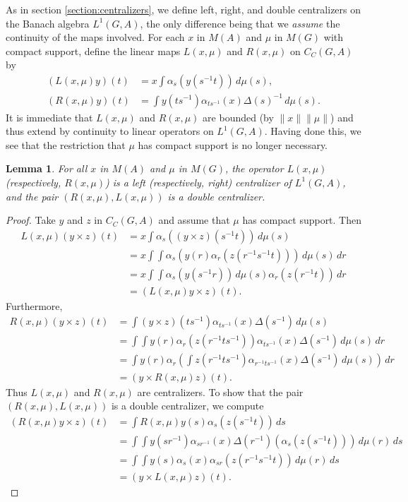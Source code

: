 \documentclass{book}
\newtheorem{lemma}[definition]{Lemma}
\begin{document}
As in section \ref{section:centralizers}, we define left, right, and double centralizers on the Banach algebra
\(L^1(G,A)\), the only difference being that we \textit{assume} the continuity of the maps
involved. For each \(x\) in \(M(A)\) and \(\mu\) in \(M(G)\) with compact support, define the linear maps \(L(x,\mu)\)
and \(R(x,\mu)\) on \(C_C(G,A)\) by
\begin{align}\label{Petersen:762}
  (L(x,\mu)y)(t)&=x\int\alpha_s(y(s^{-1}t))\,d\mu(s),\\
  (R(x,\mu)y)(t)&=\int y(t s^{-1})\alpha_{t s^{-1}}(x){\Delta(s)}^{-1}\,d\mu(s).
\end{align}
It is immediate that \(L(x,\mu)\) and \(R(x,\mu)\) are bounded (by \(\|x\|\|\mu\|\)) and thus extend by continuity to linear operators on \(L^1(G,A)\).
Having done this, we see that the restriction that \(\mu\) has compact support is no longer necessary.
\begin{lemma}\label{Petersen:763}
  For all \(x\) in \(M(A)\) and \(\mu\) in \(M(G)\), the operator \(L(x,\mu)\) (respectively, \(R(x,\mu)\)) is a left 
  (respectively, right) centralizer of \(L^1(G,A)\), and the pair \((R(x,\mu),L(x,\mu))\) is a double centralizer.
\end{lemma}
\begin{proof}
  Take \(y\) and \(z\) in \(C_C(G,A)\) and assume that \(\mu\) has compact support. Then
  \begin{align*}
    L(x,\mu)(y\times z)(t)&=x\int\alpha_s((y\times z)(s^{-1}t))\,d\mu(s)\\
    &=x\int\int\alpha_s(y(r)\alpha_r(z(r^{-1}s^{-1}t)))\,d\mu(s)\,dr\\
    &=x\int\int\alpha_s(y(s^{-1}r))\,d\mu(s)\alpha_r(z(r^{-1}t))\,dr\\
    &=(L(x,\mu)y\times z)(t).
  \end{align*}
  Furthermore,
  \begin{align*}
    R(x,\mu)(y\times z)(t)&=\int(y\times z)(t s^{-1})\alpha_{t s^{-1}}(x){\Delta(s^{-1})}\,d\mu(s)\\
    &=\int\int y(r)\alpha_r(z(r^{-1}t s^{-1}))\alpha_{t s^{-1}}(x)\Delta(s^{-1})\,d\mu(s)\,dr\\
    &=\int y(r)\alpha_r(\int z(r^{-1}t s^{-1})\alpha_{r^{-1}t s^{-1}}(x)\Delta(s^{-1})\,d\mu(s))\,dr\\
    &=(y\times R(x,\mu)z)(t).
  \end{align*}
  Thus \(L(x,\mu)\) and \(R(x,\mu)\) are centralizers. To show that the pair \((R(x,\mu),L(x,\mu))\) is a double centralizer, we compute
  \begin{align*}
    (R(x,\mu)y\times z)(t)&=\int R(x,\mu)y(s)\alpha_s(z(s^{-1}t))\,ds\\
    &=\int\int y(s r^{-1})\alpha_{s r^{-1}}(x)\Delta(r^{-1})(\alpha_s(z(s^{-1}t)))\,d\mu(r)\,ds\\
    &=\int\int y(s)\alpha_s(x)\alpha_{sr}(z(r^{-1}s^{-1}t))\,d\mu(r)\,ds\\
    &=(y\times L(x,\mu)z)(t).
  \end{align*}
\end{proof}
\end{document}
